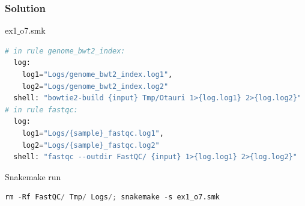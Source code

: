 \begin{frame}[containsverbatim]
\frametitle{Solution}
\begin{exampleblock}{ex1$\_$o7.smk}
\begin{lstlisting}[language=python]
# in rule genome_bwt2_index:
  log:
    log1="Logs/genome_bwt2_index.log1",
    log2="Logs/genome_bwt2_index.log2"
  shell: "bowtie2-build {input} Tmp/Otauri 1>{log.log1} 2>{log.log2}"
# in rule fastqc:
  log:
    log1="Logs/{sample}_fastqc.log1",
    log2="Logs/{sample}_fastqc.log2"
  shell: "fastqc --outdir FastQC/ {input} 1>{log.log1} 2>{log.log2}"
\end{lstlisting}
\end{exampleblock}
\begin{exampleblock}{Snakemake run}
\begin{lstlisting}[language=python]
rm -Rf FastQC/ Tmp/ Logs/; snakemake -s ex1_o7.smk
\end{lstlisting}
\end{exampleblock}
\end{frame}